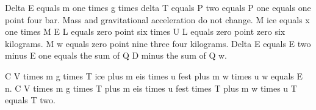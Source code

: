 Delta E equals m one times g times delta T equals P two equals P one equals one point four bar. Mass and gravitational acceleration do not change. M ice equals x one times M E L equals zero point six times U L equals zero point zero six kilograms. M w equals zero point nine three four kilograms. Delta E equals E two minus E one equals the sum of Q D minus the sum of Q w.

C V times m g times T ice plus m eis times u fest plus m w times u w equals E n. C V times m g times T plus m eis times u fest times T plus m w times u T equals T two.